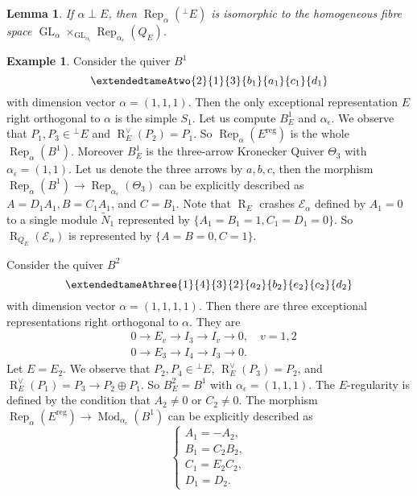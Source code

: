 \documentclass{amsart}
\newtheorem{lemma}[theorem]{Lemma}
\theoremstyle{definition}
\newtheorem{example}[theorem]{Example}
\theoremstyle{remark}
\numberwithin{equation}{section}
\begin{document}
\begin{lemma} \label{L:homofibre}\cite[Theorem 3.2]{S1} If $\alpha\perp E$, then ${\operatorname{Rep}}_\alpha({{^\perp}\!} E)$ is isomorphic to the homogeneous fibre space  ${\operatorname{GL}}_\alpha\times_{{\operatorname{GL}}_{\alpha_\epsilon}}{\operatorname{Rep}}_{\alpha_\epsilon}(Q_E)$.
\end{lemma}

\begin{example} \label{Ex:1}
Consider the quiver $B^1$
$$\extendedtameAtwo{2}{1}{3}{b_1}{a_1}{c_1}{d_1}$$ with dimension vector $\alpha=(1,1,1)$. Then the only exceptional representation $E$ right orthogonal to $\alpha$ is the simple $S_1$.
Let us compute $B^1_E$ and $\alpha_\epsilon$. We observe that $P_1,P_3\in{{^\perp}\!} E$ and ${\operatorname{R}}_E^\vee(P_2)=P_1$. So ${\operatorname{Rep}}_\alpha(E^{{\operatorname{reg}}})$ is the whole ${\operatorname{Rep}}_\alpha(B^1)$. Moreover $B^1_E$ is the three-arrow Kronecker Quiver $\Theta_3$ with $\alpha_\epsilon=(1,1)$. Let us denote the three arrows by $a,b,c$, then the morphism ${\operatorname{Rep}}_\alpha(B^1)\to{\operatorname{Rep}}_{\alpha_\epsilon}(\Theta_3)$ can be explicitly described as $A=D_1A_1,B=C_1A_1$, and $C=B_1$.
Note that ${\operatorname{R}}_E$ crashes ${\mathcal{{E}}}_\alpha$ defined by $A_1=0$ to a single module $\tilde{N}_1$ represented by $\{A_1=B_1=1,C_1=D_1=0\}$.
So ${\operatorname{R}}_{Q_E}({\mathcal{{E}}}_\alpha)$ is represented by $\{A=B=0,C=1\}$.

Consider the quiver $B^2$
$$\extendedtameAthree{1}{4}{3}{2}{a_2}{b_2}{e_2}{c_2}{d_2}$$ with dimension vector $\alpha=(1,1,1,1)$. Then there are three exceptional representations right orthogonal to $\alpha$. They are \begin{align*}
& 0\to E_v\to I_3\to I_v\to 0,\quad v=1,2\\
& 0\to E_3\to I_4\to I_3\to 0.
\end{align*}
Let $E=E_2$. We observe that $P_2,P_4\in {{^\perp}\!} E$, ${\operatorname{R}}_{E}^\vee(P_3)=P_2$, and ${\operatorname{R}}_{E}^\vee(P_1)=P_3\to P_2\oplus P_1$.
So $B^2_{E}=B^1$ with $\alpha_\epsilon=(1,1,1)$. The $E$-regularity is defined by the condition that $A_2\neq 0$ or $C_2\neq 0$. The morphism ${\operatorname{Rep}}_\alpha(E^{{\operatorname{reg}}})\to{\operatorname{Mod}}_{\alpha_\epsilon}(B^1)$ can be explicitly described as $$\begin{cases}
A_1=-A_2,\\ B_1=C_2B_2,\\ C_1=E_2C_2,\\ D_1=D_2. \end{cases}$$


\end{example}
\end{document}
